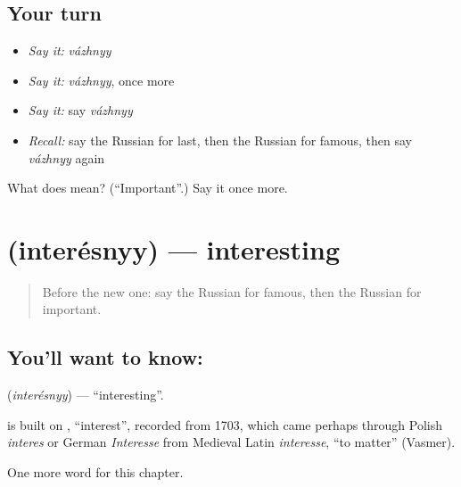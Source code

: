 \subsection*{Your turn}
\begin{itemize}
\raggedright
  \item \emph{Say it:} \emph{vázhnyy}
  \item \emph{Say it:} \emph{vázhnyy}, once more
  \item \emph{Say it:} say \emph{vázhnyy}
  \item \emph{Recall:} say the Russian for last, then the Russian for famous, then say \emph{vázhnyy} again
\end{itemize}

\begin{tcolorbox}[breakable,colback=teal!4,colframe=teal!35!black,title={Before you move on}]
What does  mean? (\textquotedblleft{}Important\textquotedblright{}.) Say it once more.
\end{tcolorbox}
\section[\texorpdfstring{\ru{интересный} (interésnyy)}{интересный (interésnyy)}]{ (interésnyy) — interesting}

\label{lesson:RU-C126-interesting}



\begin{quote}
Before the new one: say the Russian for famous, then the Russian for important.
\end{quote}

\subsection*{You'll want to know: }
\textbf{} (\emph{interésnyy}) — \textquotedblleft{}interesting\textquotedblright{}.

\begin{cousinweb}
\textbf{} is built on \emph{}, \textquotedblleft{}interest\textquotedblright{}, recorded from 1703, which came perhaps through Polish \emph{interes} or German \emph{Interesse} from Medieval Latin \emph{interesse}, \textquotedblleft{}to matter\textquotedblright{} (Vasmer).
\end{cousinweb}

\begin{grammarlens}[title={What you've built}]
One more word for this chapter.
\end{grammarlens}

